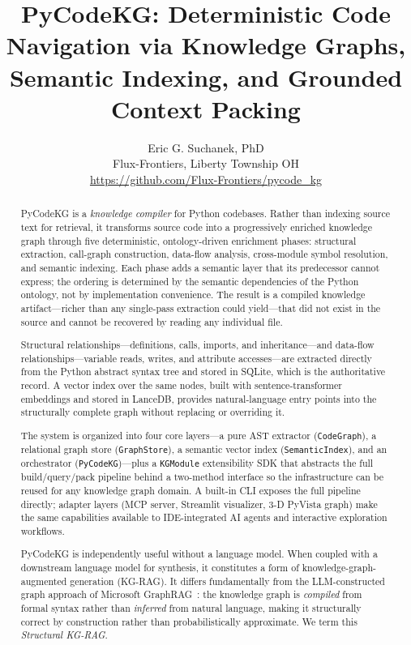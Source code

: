 \documentclass[10pt]{article}
\title{PyCodeKG: Deterministic Code Navigation via Knowledge Graphs,
Semantic Indexing, and Grounded Context Packing}
\author{Eric G. Suchanek, PhD\\
Flux-Frontiers, Liberty Township OH\\[4pt]
\small\url{https://github.com/Flux-Frontiers/pycode\_kg}}
\date{}
\begin{document}
\maketitle

\begin{abstract}
PyCodeKG is a \emph{knowledge compiler} for Python codebases. Rather than
indexing source text for retrieval, it transforms source code into a
progressively enriched knowledge graph through five deterministic, ontology-driven
enrichment phases: structural extraction, call-graph construction, data-flow
analysis, cross-module symbol resolution, and semantic indexing. Each phase adds
a semantic layer that its predecessor cannot express; the ordering is determined
by the semantic dependencies of the Python ontology, not by implementation
convenience. The result is a compiled knowledge artifact---richer than any
single-pass extraction could yield---that did not exist in the source and cannot
be recovered by reading any individual file.

Structural relationships---definitions, calls, imports, and inheritance---and
data-flow relationships---variable reads, writes, and attribute accesses---are
extracted directly from the Python abstract syntax tree and stored in SQLite,
which is the authoritative record. A vector index over the same nodes, built
with sentence-transformer embeddings and stored in LanceDB, provides
natural-language entry points into the structurally complete graph without
replacing or overriding it.

The system is organized into four core layers---a pure AST extractor
(\texttt{CodeGraph}), a relational graph store (\texttt{GraphStore}), a semantic
vector index (\texttt{SemanticIndex}), and an orchestrator (\texttt{PyCodeKG})---plus a
\texttt{KGModule} extensibility SDK that abstracts the full build/query/pack pipeline
behind a two-method interface so the infrastructure can be reused for any knowledge
graph domain. A built-in CLI exposes the full pipeline directly; adapter layers (MCP server,
Streamlit visualizer, 3-D PyVista graph) make the same capabilities available to
IDE-integrated AI agents and interactive exploration workflows.

PyCodeKG is independently useful without a language model. When coupled with a
downstream language model for synthesis, it constitutes a form of
knowledge-graph-augmented generation (KG-RAG). It differs fundamentally
from the LLM-constructed graph approach of Microsoft GraphRAG~\cite{edge2024graphrag}:
the knowledge graph is \emph{compiled} from formal syntax rather than \emph{inferred}
from natural language, making it structurally correct by construction rather than
probabilistically approximate. We term this \emph{Structural KG-RAG}.
\end{abstract}
\end{document}
